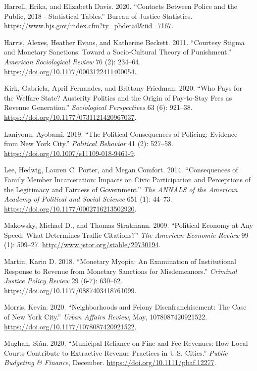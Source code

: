 \documentclass[
  12pt,
]{article}
\newlength{\cslhangindent}
\newenvironment{cslreferences}%
  {\setlength{\parindent}{0pt}%
  \everypar{\setlength{\hangindent}{\cslhangindent}}\ignorespaces}%
  {\par}
\begin{document}
\begin{cslreferences}
\leavevmode\hypertarget{ref-Harrell2020}{}%
Harrell, Erika, and Elizabeth Davis. 2020. ``Contacts Between Police and the Public, 2018 - Statistical Tables.'' Bureau of Justice Statistics. \url{https://www.bjs.gov/index.cfm?ty=pbdetail\&iid=7167}.

\leavevmode\hypertarget{ref-Harris2011}{}%
Harris, Alexes, Heather Evans, and Katherine Beckett. 2011. ``Courtesy Stigma and Monetary Sanctions: Toward a Socio-Cultural Theory of Punishment.'' \emph{American Sociological Review} 76 (2): 234--64. \url{https://doi.org/10.1177/0003122411400054}.

\leavevmode\hypertarget{ref-Kirk2020}{}%
Kirk, Gabriela, April Fernandes, and Brittany Friedman. 2020. ``Who Pays for the Welfare State? Austerity Politics and the Origin of Pay-to-Stay Fees as Revenue Generation.'' \emph{Sociological Perspectives} 63 (6): 921--38. \url{https://doi.org/10.1177/0731121420967037}.

\leavevmode\hypertarget{ref-Laniyonu2019}{}%
Laniyonu, Ayobami. 2019. ``The Political Consequences of Policing: Evidence from New York City.'' \emph{Political Behavior} 41 (2): 527--58. \url{https://doi.org/10.1007/s11109-018-9461-9}.

\leavevmode\hypertarget{ref-Lee2014}{}%
Lee, Hedwig, Lauren C. Porter, and Megan Comfort. 2014. ``Consequences of Family Member Incarceration: Impacts on Civic Participation and Perceptions of the Legitimacy and Fairness of Government.'' \emph{The ANNALS of the American Academy of Political and Social Science} 651 (1): 44--73. \url{https://doi.org/10.1177/0002716213502920}.

\leavevmode\hypertarget{ref-Makowsky2009}{}%
Makowsky, Michael D., and Thomas Stratmann. 2009. ``Political Economy at Any Speed: What Determines Traffic Citations?'' \emph{The American Economic Review} 99 (1): 509--27. \url{http://www.jstor.org/stable/29730194}.

\leavevmode\hypertarget{ref-Martin2018}{}%
Martin, Karin D. 2018. ``Monetary Myopia: An Examination of Institutional Response to Revenue from Monetary Sanctions for Misdemeanors.'' \emph{Criminal Justice Policy Review} 29 (6-7): 630--62. \url{https://doi.org/10.1177/0887403418761099}.

\leavevmode\hypertarget{ref-Morris2020}{}%
Morris, Kevin. 2020. ``Neighborhoods and Felony Disenfranchisement: The Case of New York City.'' \emph{Urban Affairs Review}, May, 1078087420921522. \url{https://doi.org/10.1177/1078087420921522}.

\leavevmode\hypertarget{ref-Mughan2020}{}%
Mughan, Siân. 2020. ``Municipal Reliance on Fine and Fee Revenues: How Local Courts Contribute to Extractive Revenue Practices in U.S. Cities.'' \emph{Public Budgeting \& Finance}, December. \url{https://doi.org/10.1111/pbaf.12277}.


\end{cslreferences}
\end{document}
